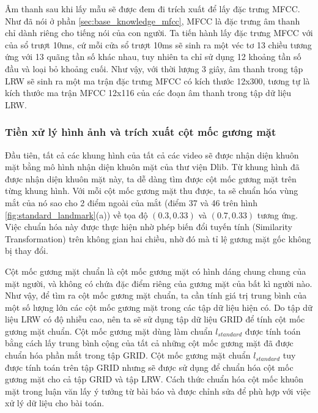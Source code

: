 Âm thanh sau khi lấy mẫu sẽ được đem đi trích xuất để lấy đặc trưng MFCC. Như đã nói ở phần \ref{sec:base_knowledge_mfcc}, MFCC là đặc trưng âm thanh chỉ dành riêng cho tiếng nói của con người. Ta tiến hành lấy đặc trưng MFCC với của sổ trượt 10ms, cứ mỗi cửa sổ trượt 10ms sẽ sinh ra một véc tơ 13 chiều tương ứng với 13 quãng tần số khác nhau, tuy nhiên ta chỉ sử dụng 12 khoảng tần số đầu và loại bỏ khoảng cuối. Như vậy, với thời lượng 3 giây, âm thanh trong tập LRW sẽ sinh ra một ma trận đặc trưng MFCC có kích thước 12x300, tương tự là kích thước ma trận MFCC 12x116 của các đoạn âm thanh trong tập dữ liệu LRW.

\subsubsection{Tiền xử lý hình ảnh và trích xuất cột mốc gương mặt}

Đầu tiên, tất cả các khung hình của tất cả các video sẽ được nhận diện khuôn mặt bằng mô hình nhận diện khuôn mặt của thư viện Dlib. Từ khung hình đã được nhận diện khuôn mặt này, ta dễ dàng tìm được cột mốc gương mặt trên từng khung hình. Với mỗi cột mốc gương mặt thu được, ta sẽ chuẩn hóa vùng mắt của nó sao cho 2 điểm ngoài của mắt (điểm 37 và 46 trên hình \ref{fig:standard_landmark}(a)) về tọa độ $(0.3, 0.33)$ và $(0.7, 0.33)$ tương ứng. Việc chuẩn hóa này được thực hiện nhờ phép biến đổi tuyến tính (Similarity Transformation) trên không gian hai chiều, nhờ đó mà tỉ lệ gương mặt gốc không bị thay đổi.

Cột mốc gương mặt chuẩn là cột mốc gương mặt có hình dáng chung chung của mặt người, và không có chứa đặc điểm riêng của gương mặt của bất kì người nào. Như vậy, để tìm ra cột mốc gương mặt chuẩn, ta cần tính giá trị trung bình của một số lượng lớn các cột mốc gương mặt trong các tập dữ liệu hiện có. Do tập dữ liệu LRW có độ nhiễu cao, nên ta sẽ sử dụng tập dữ liệu GRID để tính cột mốc gương mặt chuẩn. Cột mốc gương mặt dùng làm chuẩn $l_{standard}$ được tính toán bằng cách lấy trung bình cộng của tất cả những cột mốc gương mặt đã được chuẩn hóa phần mắt trong tập GRID. Cột mốc gương mặt chuẩn $l_{standard}$ tuy được tính toán trên tập GRID nhưng sẽ được sử dụng để chuẩn hóa cột mốc gương mặt cho cả tập GRID và tập LRW. Cách thức chuẩn hóa cột mốc khuôn mặt trong luận văn lấy ý tưởng từ bài báo \cite{gen_face_landmark} và được chỉnh sửa để phù hợp với việc xử lý dữ liệu cho bài toán.

